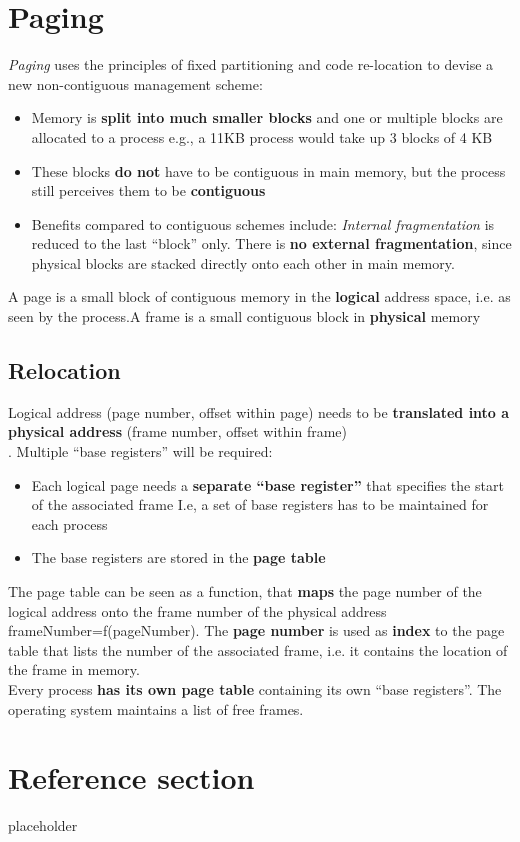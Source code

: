 \documentclass{article}
\begin{document}
\section{Paging}
\begin{flushleft}
\textit{Paging} uses the principles of fixed partitioning and code re-location to devise a new non-contiguous management scheme:
\begin{itemize}
	\item Memory is \textbf{split into much smaller blocks} and one or multiple blocks are allocated to a process e.g., a 11KB process would take up 3 blocks of 4 KB
	\item These blocks \textbf{do not} have to be contiguous in main memory, but the process still perceives them to be \textbf{contiguous}
	\item Benefits compared to contiguous schemes include: \textit{Internal fragmentation} is reduced to the last “block” only. There is \textbf{no external fragmentation}, since physical blocks are stacked directly onto each other in main memory.
\end{itemize}
A page is a small block of contiguous memory in the \textbf{logical} address space, i.e. as seen by the process.A frame is a small contiguous block in \textbf{physical} memory
\end{flushleft}

\subsection{Relocation}
\begin{flushleft}
Logical address (page number, offset within page) needs to be \textbf{translated into a physical address} (frame number, offset within frame)\\.
Multiple “base registers” will be required:
\begin{itemize}
	\item Each logical page needs a \textbf{separate “base register”} that specifies the start of the associated frame I.e, a set of base registers has to be maintained for each process
	\item The base registers are stored in the \textbf{page table}
\end{itemize}
\bigskip

The page table can be seen as a function, that \textbf{maps} the page number of the logical address onto the frame number of the physical address frameNumber=f(pageNumber). The \textbf{page number} is used as \textbf{index} to the page table that lists the number of the associated frame, i.e. it contains the location of the frame in memory.\\
Every process \textbf{has its own page table} containing its own “base registers”. The operating system maintains a list of free frames.
\end{flushleft}

\pagebreak
\section*{Reference section} \label{sec:reference}
\begin{description}
	\item[placeholder] \hfill \\
\end{description}
\end{document}

